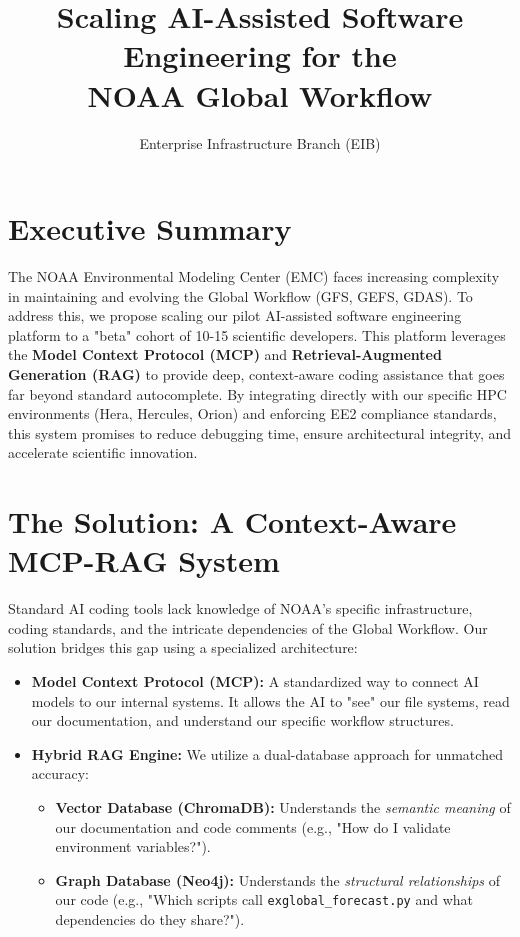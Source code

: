 \documentclass[10pt]{article}
\title{\textbf{Scaling AI-Assisted Software Engineering for the\\NOAA Global Workflow}}
\author{Enterprise Infrastructure Branch (EIB)}
\date{}
\begin{document}
\maketitle
\thispagestyle{empty}

\section*{Executive Summary}
The NOAA Environmental Modeling Center (EMC) faces increasing complexity in maintaining and evolving the Global Workflow (GFS, GEFS, GDAS). To address this, we propose scaling our pilot AI-assisted software engineering platform to a "beta" cohort of 10-15 scientific developers. This platform leverages the \textbf{Model Context Protocol (MCP)} and \textbf{Retrieval-Augmented Generation (RAG)} to provide deep, context-aware coding assistance that goes far beyond standard autocomplete. By integrating directly with our specific HPC environments (Hera, Hercules, Orion) and enforcing EE2 compliance standards, this system promises to reduce debugging time, ensure architectural integrity, and accelerate scientific innovation.

\section*{The Solution: A Context-Aware MCP-RAG System}
Standard AI coding tools lack knowledge of NOAA's specific infrastructure, coding standards, and the intricate dependencies of the Global Workflow. Our solution bridges this gap using a specialized architecture:

\begin{itemize}
    \item \textbf{Model Context Protocol (MCP):} A standardized way to connect AI models to our internal systems. It allows the AI to "see" our file systems, read our documentation, and understand our specific workflow structures.
    \item \textbf{Hybrid RAG Engine:} We utilize a dual-database approach for unmatched accuracy:
    \begin{itemize}
        \item \textbf{Vector Database (ChromaDB):} Understands the \textit{semantic meaning} of our documentation and code comments (e.g., "How do I validate environment variables?").
        \item \textbf{Graph Database (Neo4j):} Understands the \textit{structural relationships} of our code (e.g., "Which scripts call \texttt{exglobal\_forecast.py} and what dependencies do they share?").
    \end{itemize}
\end{itemize}
\end{document}
